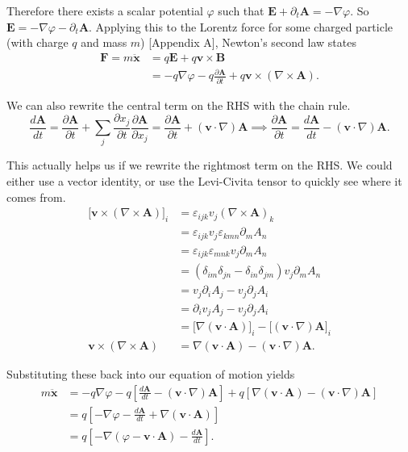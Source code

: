 \documentclass[12pt]{revtex4-2}
\begin{document}
Therefore there exists a scalar potential $\varphi$ such that $\mathbf{E} + \partial_t\mathbf{A} = -\nabla\varphi$.  So $\mathbf{E} = -\nabla\varphi - \partial_t\mathbf{A}$.  Applying this to the Lorentz force for some charged particle (with charge $q$ and mass $m$) [Appendix A], Newton's second law states
\begin{align}
    \mathbf{F} = m\ddot{\mathbf{x}} &= q\mathbf{E} + q\mathbf{v}\times\mathbf{B} \\
    &= -q\nabla\varphi - q\frac{\partial \mathbf{A}}{\partial t} + q\mathbf{v}\times(\nabla \times \mathbf{A}).
\end{align}

We can also rewrite the central term on the RHS with the chain rule.
\begin{equation}
    \frac{d\mathbf{A}}{dt} = \frac{\partial \mathbf{A}}{\partial t} + \sum_j \frac{\partial x_j}{\partial t}\frac{\partial \mathbf{A}}{\partial x_j} = \frac{\partial \mathbf{A}}{\partial t} + (\mathbf{v} \cdot \nabla)\mathbf{A} \implies \frac{\partial \mathbf{A}}{\partial t} = \frac{d\mathbf{A}}{dt} - (\mathbf{v} \cdot \nabla)\mathbf{A}.
\end{equation}

This actually helps us if we rewrite the rightmost term on the RHS.  We could either use a vector identity, or use the Levi-Civita tensor to quickly see where it comes from.
\begin{align}
    \big[\mathbf{v}\times(\nabla \times \mathbf{A})\big]_i &= \varepsilon_{ijk}v_j(\nabla \times \mathbf{A})_k \\
    &= \varepsilon_{ijk}v_j\varepsilon_{kmn}\partial_m A_n \\
    &= \varepsilon_{ijk}\varepsilon_{mnk}v_j\partial_m A_n \\
    &= (\delta_{im}\delta_{jn} - \delta_{in}\delta_{jm})v_j\partial_m A_n \\
    &= v_j\partial_i A_j - v_j\partial_j A_i \\
    &= \partial_iv_j A_j - v_j\partial_j A_i \\
    &= \big[ \nabla(\mathbf{v} \cdot \mathbf{A}) \big]_i - \big[ (\mathbf{v}\cdot\nabla) \mathbf{A} \big]_i \\
    \mathbf{v}\times(\nabla \times \mathbf{A}) &= \nabla (\mathbf{v} \cdot \mathbf{A}) - (\mathbf{v}\cdot\nabla) \mathbf{A}.
\end{align}

Substituting these back into our equation of motion yields
\begin{align}
    m\ddot{\mathbf{x}} &= -q\nabla\varphi - q\left[ \frac{d\mathbf{A}}{dt} - (\mathbf{v} \cdot \nabla)\mathbf{A} \right] + q\left[ \nabla(\mathbf{v} \cdot \mathbf{A}) - (\mathbf{v}\cdot\nabla) \mathbf{A} \right] \\
    &= q\left[ -\nabla\varphi - \frac{d\mathbf{A}}{dt} + \nabla(\mathbf{v} \cdot \mathbf{A}) \right] \\
    &= q\left[ -\nabla\left( \varphi - \mathbf{v}\cdot\mathbf{A} \right) - \frac{d\mathbf{A}}{dt} \right]. \label{eqn:em-eom}
\end{align}
\end{document}
